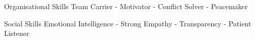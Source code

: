 
\begin{cvskills}
  \cvskill
    {Organisational Skills} %
    {Team Carrier - Motivator - Conflict Solver - Peacemaker} %

  \cvskill
    {Social Skills} %
    {Emotional Intelligence - Strong Empathy - Transparency - Patient Listener} %
    
\end{cvskills}